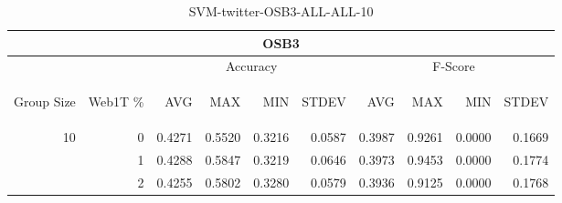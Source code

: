 \begin{center}
\begin{table}[htbp] 
 \begin{center}
\begin{tabular}{ | r | r | r | r | r | r | r | r | r | r |}
\hline
\multicolumn{10}{|c|}{OSB3}\\
\hline
 & & \multicolumn{4}{|c|}{Accuracy} & \multicolumn{4}{|c|}{F-Score}\\ \cline{3-10}
\begin{sideways}Group Size\end{sideways} & \begin{sideways}Web1T \%\end{sideways} & \begin{sideways}AVG\end{sideways} & \begin{sideways}MAX\end{sideways} & \begin{sideways}MIN\end{sideways} & \begin{sideways}STDEV\end{sideways} & \begin{sideways}AVG\end{sideways} & \begin{sideways}MAX\end{sideways} & \begin{sideways}MIN\end{sideways} & \begin{sideways}STDEV\end{sideways}\\
\hline
\multirow{2}{*}{10}
 & 0 & 0.4271 & 0.5520 & 0.3216 & 0.0587 & 0.3987 & 0.9261 & 0.0000 & 0.1669\\ \cline{2-10}
 & 1 & 0.4288 & 0.5847 & 0.3219 & 0.0646 & 0.3973 & 0.9453 & 0.0000 & 0.1774\\ \cline{2-10}
 & 2 & 0.4255 & 0.5802 & 0.3280 & 0.0579 & 0.3936 & 0.9125 & 0.0000 & 0.1768\\ \cline{2-10}
\hline
\end{tabular}
\caption{SVM-twitter-OSB3-ALL-ALL-10}
\label{table:SVM-twitter-OSB3-ALL-ALL-10}
\end{center}
 \end{table}
\end{center}

